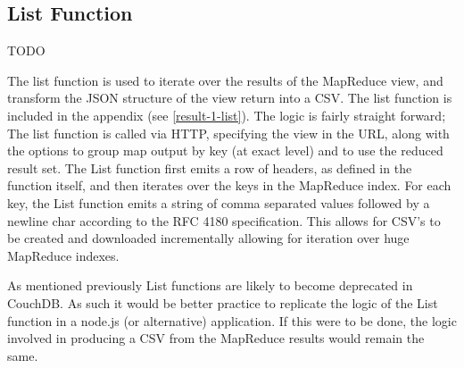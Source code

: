 

\subsection{List Function}
TODO

The list function is used to iterate over the results of the MapReduce view, and transform the JSON structure of the view return into a CSV. The list function is included in the appendix (see \ref{result-1-list}). The logic is fairly straight forward; The list function is called via HTTP, specifying the view in the URL, along with the options to group map output by key (at exact level) and to use the reduced result set. The List function first emits a row of headers, as defined in the function itself, and then iterates over the keys in the MapReduce index. For each key, the List function emits a string of comma separated values followed by a newline char according to the RFC 4180 specification. This allows for CSV's to be created and downloaded incrementally allowing for iteration over huge MapReduce indexes.

As mentioned previously List functions are likely to become deprecated in CouchDB. As such it would be better practice to replicate the logic of the List function in a node.js (or alternative) application. If this were to be done, the logic involved in producing a CSV from the MapReduce results would remain the same.